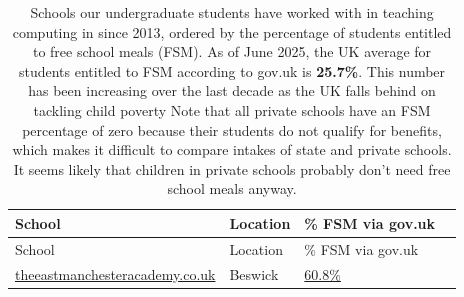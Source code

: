 \documentclass[
  12pt,
]{book}
\begin{document}
\begin{longtable}[]{@{}
  >{\raggedright\arraybackslash}p{}
  >{\raggedright\arraybackslash}p{}
  >{\raggedright\arraybackslash}p{}
  >{\raggedright\arraybackslash}p{}@{}}
\caption{\label{tab:schooltable} Schools our undergraduate students have worked with in teaching computing in since 2013, ordered by the percentage of students entitled to free school meals (FSM). As of June 2025, the UK average for students entitled to FSM according to gov.uk is \textbf{25.7\%}. \citep{averagefsm} This number has been increasing over the last decade as the UK falls behind on tackling child poverty \citep{childpoverty, bbcfsm} Note that all private schools have an FSM percentage of zero because their students do not qualify for benefits, which makes it difficult to compare intakes of state and private schools. It seems likely that children in private schools probably don't need free school meals anyway.}\tabularnewline
\toprule\noalign{}
\begin{minipage}[b]{\linewidth}\raggedright
School
\end{minipage} & \begin{minipage}[b]{\linewidth}\raggedright
Location
\end{minipage} & \begin{minipage}[b]{\linewidth}\raggedright
\% FSM via gov.uk
\end{minipage} & \begin{minipage}[b]{\linewidth}\raggedright
\end{minipage} \\
\midrule\noalign{}
\endfirsthead
\toprule\noalign{}
\begin{minipage}[b]{\linewidth}\raggedright
School
\end{minipage} & \begin{minipage}[b]{\linewidth}\raggedright
Location
\end{minipage} & \begin{minipage}[b]{\linewidth}\raggedright
\% FSM via gov.uk
\end{minipage} & \begin{minipage}[b]{\linewidth}\raggedright
\end{minipage} \\
\midrule\noalign{}
\endhead
\bottomrule\noalign{}
\endlastfoot
\href{https://www.theeastmanchesteracademy.co.uk}{theeastmanchesteracademy.co.uk} & Beswick & \href{https://bit.ly/temac}{60.8\%} & \\

\end{longtable}
\end{document}
